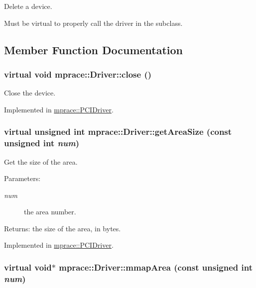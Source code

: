Delete a device. 

Must be virtual to properly call the driver in the subclass.

\subsection{Member Function Documentation}
\hypertarget{classmprace_1_1Driver_a2}{
\subsubsection[close]{\setlength{\rightskip}{0pt plus 5cm}virtual void mprace::Driver::close ()}}
\label{classmprace_1_1Driver_a2}


Close the device. 



Implemented in \hyperlink{classmprace_1_1PCIDriver_a3}{mprace::PCIDriver}.\hypertarget{classmprace_1_1Driver_a5}{
\subsubsection[getAreaSize]{\setlength{\rightskip}{0pt plus 5cm}virtual unsigned int mprace::Driver::get\-Area\-Size (const unsigned int {\em num})}}
\label{classmprace_1_1Driver_a5}


Get the size of the area. 

\begin{Desc}
\item[Parameters:]
\begin{description}
\item[{\em num}]the area number. \end{description}
\end{Desc}
\begin{Desc}
\item[Returns:]the size of the area, in bytes.\end{Desc}


Implemented in \hyperlink{classmprace_1_1PCIDriver_a6}{mprace::PCIDriver}.\hypertarget{classmprace_1_1Driver_a3}{
\subsubsection[mmapArea]{\setlength{\rightskip}{0pt plus 5cm}virtual void$\ast$ mprace::Driver::mmap\-Area (const unsigned int {\em num})}}
\label{classmprace_1_1Driver_a3}


